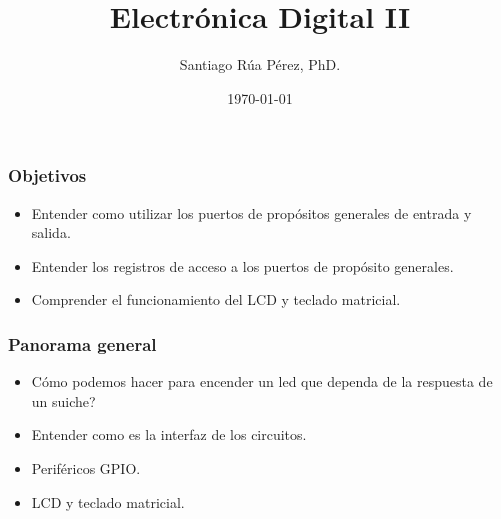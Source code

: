 \documentclass[10.5pt,scale=1.0,t,aspectratio=169,hyperref={pdfpagelabels=false}]{beamer}
\title{Electrónica Digital II}
\author{Santiago Rúa Pérez, PhD.}
\date{\today}
\begin{document}
	\begin{frame}
		\titlepage
	\end{frame}




	\frame{
		\begin{center}
			\LARGE \textcolor{blue}{GENERAL PURPOSE INPUT-OUTPUT GPIO}
		\end{center}
		
	}
	

\begin{frame}
\frametitle{Objetivos}
\begin{itemize}
\item Entender como utilizar los puertos de propósitos generales de entrada y salida. 
\item Entender los registros de acceso a los puertos de propósito generales.
\item Comprender el funcionamiento del LCD y teclado matricial.
\end{itemize}
\end{frame}
\begin{frame}
	\frametitle{Panorama general}
	\begin{itemize}
		\item Cómo podemos hacer para encender un led que dependa de la respuesta de un suiche?
		\item Entender como es la interfaz de los circuitos.
		\item Periféricos GPIO.
		\item LCD y teclado matricial. 
	\end{itemize}
\end{frame}
\end{document}
